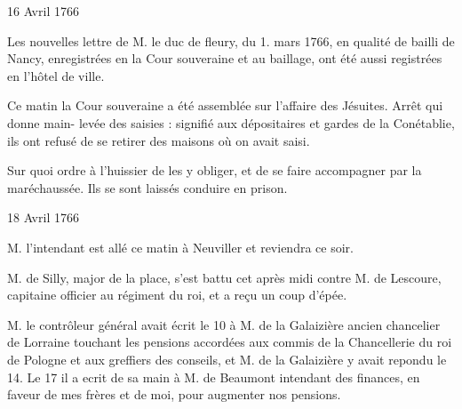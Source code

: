                      \begin{diary}{16 Avril 1766}{}

                         Les nouvelles lettre de M. le duc de fleury,
                           du 1. mars
                              1766, en qualité de bailli de
                           Nancy, enregistrées en la Cour souveraine et au
                           baillage, ont été aussi
                           registrées en l'hôtel
                              de ville.
                        \bigskip


                         Ce matin la Cour souveraine a été assemblée sur
                           l'affaire des Jésuites. Arrêt qui donne main-
                              levée des saisies : signifié aux dépositaires
                           et gardes de la Conétablie, ils ont refusé de
                           se retirer des maisons où on avait saisi. \bigskip


                         Sur quoi ordre à l'huissier de les
                           y obliger,
                           et de se faire accompagner par la maréchaussée.
                           Ils se sont laissés conduire en prison. \bigskip


                     \end{diary}

                     \begin{diary}{18 Avril 1766}{}


                           M. l'intendant est allé ce matin
                           à Neuviller
                           et reviendra ce soir. \bigskip



                           M. de Silly, major de la place, s'est
                           battu
                           cet après midi contre M. de
                              Lescoure, capitaine
                           officier au régiment du roi, et a reçu un coup
                           d'épée. \bigskip



                           M. le contrôleur
                              général avait écrit le
                              10
                           à M. de la Galaizière ancien chancelier de Lorraine
                           touchant les pensions accordées aux commis
                           de la Chancellerie du roi de Pologne et aux greffiers
                           des conseils, et M. de la Galaizière y avait repondu
                           le 14. Le
                              17 il a ecrit de sa main à
                           M. de Beaumont intendant des
                           finances, en faveur de
                              mes frères
                           et de moi, pour
                           augmenter nos pensions. \bigskip


                     \end{diary}

